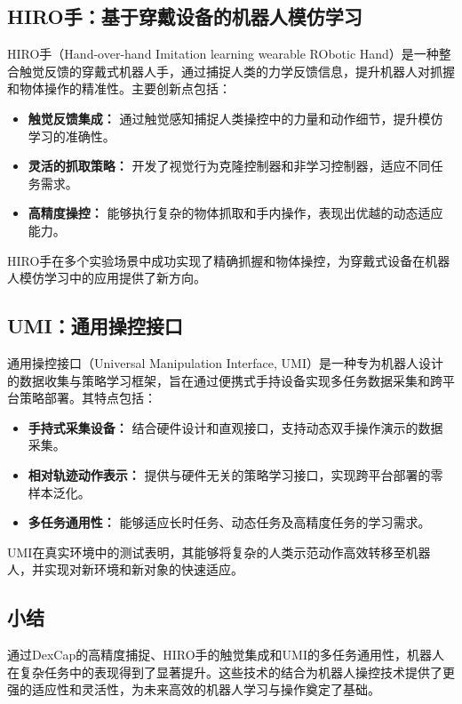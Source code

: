 \documentclass[a4paper]{article}
\begin{document}
\subsection{HIRO手：基于穿戴设备的机器人模仿学习}
HIRO手（Hand-over-hand Imitation learning wearable RObotic Hand）是一种整合触觉反馈的穿戴式机器人手，通过捕捉人类的力学反馈信息，提升机器人对抓握和物体操作的精准性\cite{wei2024wearable}。主要创新点包括：
\begin{itemize}
    \item \textbf{触觉反馈集成：} 通过触觉感知捕捉人类操控中的力量和动作细节，提升模仿学习的准确性。
    \item \textbf{灵活的抓取策略：} 开发了视觉行为克隆控制器和非学习控制器，适应不同任务需求。
    \item \textbf{高精度操控：} 能够执行复杂的物体抓取和手内操作，表现出优越的动态适应能力。
\end{itemize}
HIRO手在多个实验场景中成功实现了精确抓握和物体操控，为穿戴式设备在机器人模仿学习中的应用提供了新方向。

\subsection{UMI：通用操控接口}
通用操控接口（Universal Manipulation Interface, UMI）是一种专为机器人设计的数据收集与策略学习框架，旨在通过便携式手持设备实现多任务数据采集和跨平台策略部署\cite{chi2024universal}。其特点包括：
\begin{itemize}
    \item \textbf{手持式采集设备：} 结合硬件设计和直观接口，支持动态双手操作演示的数据采集。
    \item \textbf{相对轨迹动作表示：} 提供与硬件无关的策略学习接口，实现跨平台部署的零样本泛化。
    \item \textbf{多任务通用性：} 能够适应长时任务、动态任务及高精度任务的学习需求。
\end{itemize}
UMI在真实环境中的测试表明，其能够将复杂的人类示范动作高效转移至机器人，并实现对新环境和新对象的快速适应。

\subsection{小结}
通过DexCap的高精度捕捉、HIRO手的触觉集成和UMI的多任务通用性，机器人在复杂任务中的表现得到了显著提升。这些技术的结合为机器人操控技术提供了更强的适应性和灵活性，为未来高效的机器人学习与操作奠定了基础\cite{wang2024dexcap, wei2024wearable, chi2024universal}。
\end{document}
